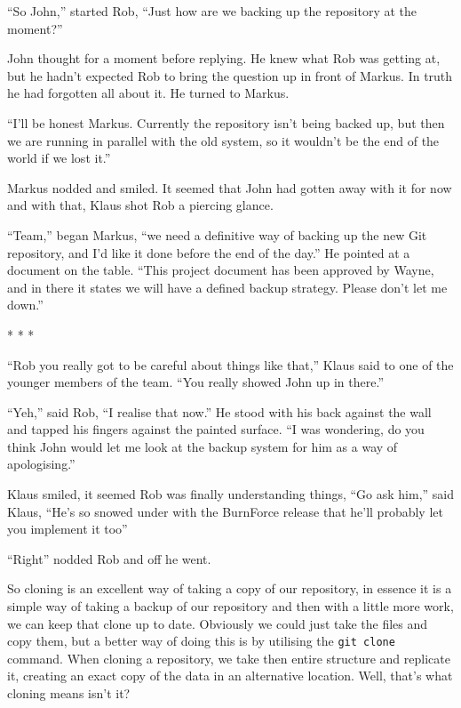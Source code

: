 \begin{trenches}
``So John,'' started Rob, ``Just how are we backing up the repository at the moment?''

John thought for a moment before replying.  He knew what Rob was getting at, but he hadn't expected Rob to bring the question up in front of Markus.  In truth he had forgotten all about it.  He turned to Markus.

``I'll be honest Markus.  Currently the repository isn't being backed up, but then we are running in parallel with the old system, so it wouldn't be the end of the world if we lost it.''

Markus nodded and smiled.  It seemed that John had gotten away with it for now and with that, Klaus shot Rob a piercing glance.  

``Team,'' began Markus, ``we need a definitive way of backing up the new Git repository, and I'd like it done before the end of the day.''  He pointed at a document on the table.  ``This project document has been approved by Wayne, and in there it states we will have a defined backup strategy.  Please don't let me down.''

\begin{center} * * * \end{center}

``Rob you really got to be careful about things like that,'' Klaus said to one of the younger members of the team.  ``You really showed John up in there.''  

``Yeh,'' said Rob, ``I realise that now.''  He stood with his back against the wall and tapped his fingers against the painted surface.  ``I was wondering, do you think John would let me look at the backup system for him as a way of apologising.''

Klaus smiled, it seemed Rob was finally understanding things, ``Go ask him,'' said Klaus, ``He's so snowed under with the BurnForce release that he'll probably let you implement it too''

``Right'' nodded Rob and off he went.
\end{trenches}

So cloning is an excellent way of taking a copy of our repository, in essence it is a simple way of taking a backup of our repository and then with a little more work, we can keep that clone up to date.  Obviously we could just take the files and copy them, but a better way of doing this is by utilising the \texttt{git clone} command.  When cloning a repository, we take then entire structure and replicate it, creating an exact copy of the data in an alternative location.  Well, that's what cloning means isn't it?

